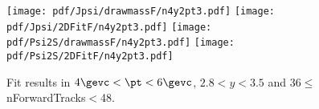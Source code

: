 \begin{figure}[H]
\begin{center}
\texttt{[image: pdf/Jpsi/drawmassF/n4y2pt3.pdf]}
\texttt{[image: pdf/Jpsi/2DFitF/n4y2pt3.pdf]}
\vspace*{-0.5cm}
\texttt{[image: pdf/Psi2S/drawmassF/n4y2pt3.pdf]}
\texttt{[image: pdf/Psi2S/2DFitF/n4y2pt3.pdf]}
\vspace*{-0.5cm}
\end{center}
\caption{Fit results in $4\gevc<\pt<6\gevc$, $2.8<y<3.5$ and 36$\leq$nForwardTracks$<$48.}
\label{Fitn4y2pt3}
\end{figure}
